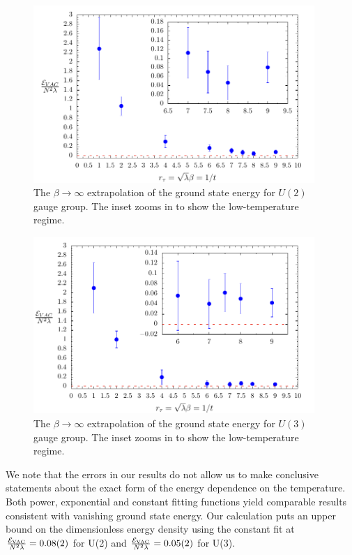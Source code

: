 \begin{figure}
\begin{center} 
\includegraphics[width=0.95\textwidth]{Figures/beta_U2.pdf}
\end{center}
\caption{\label{fig:beta_U2}The $\beta \to \infty$ extrapolation of the ground state energy for $U(2)$ gauge group. The inset zooms in to show the low-temperature regime.}
\end{figure}
\begin{figure}
\begin{center} 
\includegraphics[width=0.95\textwidth]{Figures/beta_U3.pdf}
\end{center}
\caption{\label{fig:beta_U3}The $\beta \to \infty$ extrapolation of the ground state energy for $U(3)$ gauge group. The inset zooms in to show the low-temperature regime.}
\end{figure}
We note that the errors in our results do not allow us to make conclusive statements about the exact form of the energy dependence on the temperature. Both power, exponential and constant fitting functions yield
comparable results consistent with vanishing ground state energy.  Our
calculation puts an upper bound on the dimensionless energy density using the constant fit at $\frac{\mathcal{E}_{\mathrm{VAC}}}{N^2 \lambda}=0.08(2)$ for U(2) and $\frac{\mathcal{E}_{\mathrm{VAC}}}{N^2 \lambda}=0.05(2)$ for U(3).

